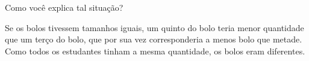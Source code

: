 \documentclass[10 pt,usenames,dvipsnames, oneside]{article}
\begin{document}
Como você explica tal situação?

\ifdefined\prof

\begin{solucao}

Se os bolos tivessem tamanhos iguais, um quinto do bolo teria menor quantidade que um terço do bolo, que por sua vez corresponderia a menos bolo que metade. Como todos os estudantes tinham a mesma quantidade, os bolos eram diferentes.
  
\end{solucao}
\fi
\end{document}

